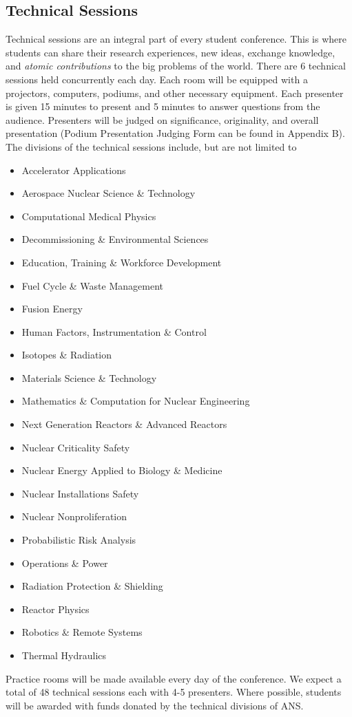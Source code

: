 \subsection{Technical Sessions}

Technical sessions are an integral part of every student conference. This is where students can share their research experiences, new ideas, exchange knowledge, and \textit{atomic contributions} to the big problems of the world. There are 6 technical sessions held concurrently each day. Each room will be equipped with a projectors, computers, podiums, and other necessary equipment. Each presenter is given 15 minutes to present and 5 minutes to answer questions from the audience. Presenters will be judged on significance, originality, and overall presentation (Podium Presentation Judging Form can be found in Appendix B). The divisions of the technical sessions include, but are not limited to
\begin{itemize}
	\item Accelerator Applications
	\item Aerospace Nuclear Science \& Technology
	\item Computational Medical Physics
	\item Decommissioning \& Environmental Sciences
	\item Education, Training \& Workforce Development
	\item Fuel Cycle \& Waste Management
	\item Fusion Energy
	\item Human Factors, Instrumentation \& Control
	\item Isotopes \& Radiation
	\item Materials Science \& Technology
	\item Mathematics \& Computation for Nuclear Engineering
	\item Next Generation Reactors \& Advanced Reactors
	\item Nuclear Criticality Safety
	\item Nuclear Energy Applied to Biology \& Medicine
	\item Nuclear Installations Safety
	\item Nuclear Nonproliferation
	\item Probabilistic Risk Analysis
	\item Operations \& Power
	\item Radiation Protection \& Shielding
	\item Reactor Physics
	\item Robotics \& Remote Systems
	\item Thermal Hydraulics
\end{itemize}
Practice rooms will be made available every day of the conference. We expect a total of 48 technical sessions each with 4-5 presenters. Where possible, students will be awarded with funds donated by the technical divisions of ANS.

